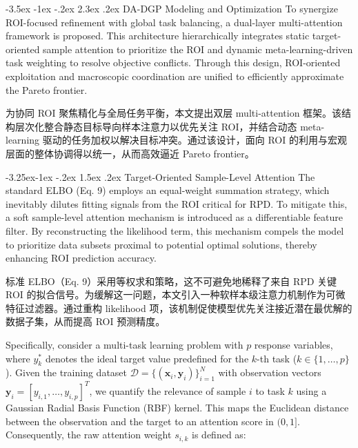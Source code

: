 \documentclass[11pt]{article}
\makeatletter
\renewcommand\section{\@startsection {section}{1}{\z@}%
                                       {-3.5ex \@plus -1ex \@minus -.2ex}%
                                       {2.3ex \@plus.2ex}%
                                       {\normalfont\fontfamily{phv}\fontsize{16}{19}\bfseries}}
\renewcommand\subsection{\@startsection{subsection}{2}{\z@}%
                                         {-3.25ex\@plus -1ex \@minus -.2ex}%
                                         {1.5ex \@plus .2ex}%
                                         {\normalfont\fontfamily{phv}\fontsize{14}{17}\bfseries}}
\makeatother
\begin{document}
\section{DA-DGP Modeling and Optimization} \label{s:sec3}
To synergize ROI-focused refinement with global task balancing, a dual-layer multi-attention framework is proposed. This architecture hierarchically integrates static target-oriented sample attention to prioritize the ROI and dynamic meta-learning-driven task weighting to resolve objective conflicts. Through this design, ROI-oriented exploitation and macroscopic coordination are unified to efficiently approximate the Pareto frontier.

为协同 ROI 聚焦精化与全局任务平衡，本文提出双层 multi-attention 框架。该结构层次化整合静态目标导向样本注意力以优先关注 ROI，并结合动态 meta-learning 驱动的任务加权以解决目标冲突。通过该设计，面向 ROI 的利用与宏观层面的整体协调得以统一，从而高效逼近 Pareto frontier。

\subsection{Target-Oriented Sample-Level Attention} \label{s:sec3.1}
The standard ELBO (Eq. 9) employs an equal-weight summation strategy, which inevitably dilutes fitting signals from the ROI critical for RPD. To mitigate this, a soft sample-level attention mechanism is introduced as a differentiable feature filter. By reconstructing the likelihood term, this mechanism compels the model to prioritize data subsets proximal to potential optimal solutions, thereby enhancing ROI prediction accuracy.

标准 ELBO（Eq. 9）采用等权求和策略，这不可避免地稀释了来自 RPD 关键 ROI 的拟合信号。为缓解这一问题，本文引入一种软样本级注意力机制作为可微特征过滤器。通过重构 likelihood 项，该机制促使模型优先关注接近潜在最优解的数据子集，从而提高 ROI 预测精度。

Specifically, consider a multi-task learning problem with $p$ response variables, where $y_{k}^{*}$ denotes the ideal target value predefined for the $k$-th task ($k \in \{1, \ldots, p\}$). Given the training dataset $\mathcal{D}=\{(\mathbf{x}_{i}, \mathbf{y}_{i})\}_{i=1}^{N}$ with observation vectors $\mathbf{y}_{i}=[y_{i,1}, \ldots, y_{i,p}]^{T}$, we quantify the relevance of sample $i$ to task $k$ using a Gaussian Radial Basis Function (RBF) kernel. This maps the Euclidean distance between the observation and the target to an attention score in $(0, 1]$. Consequently, the raw attention weight $s_{i,k}$ is defined as:
\end{document}
